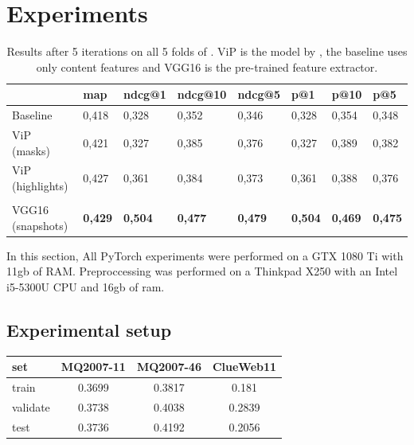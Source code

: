 \section{Experiments}\label{sec:experiments}

\begin{table}[t]
\begin{tabular}{l | lllllll }
\toprule
         & map   & ndcg@1 & ndcg@10 & ndcg@5 & p@1   & p@10  & p@5   \\ \midrule
Baseline  & 0,418 & 0,328  & 0,352   & 0,346  & 0,328 & 0,354 & 0,348 \\
ViP (masks)       & 0,421 & 0,327  & 0,385   & 0,376  & 0,327 & 0,389 & 0,382 \\
ViP (highlights)  & 0,427 & 0,361  & 0,384   & 0,373  & 0,361 & 0,388 & 0,376 \\
                 &       &        &         &        &       &       &       \\\bottomrule
VGG16 (snapshots) & \textbf{0,429} & \textbf{0,504}  & \textbf{0,477}   & \textbf{0,479}  & \textbf{0,504} & \textbf{0,469} & \textbf{0,475} \\ \bottomrule
\end{tabular}
\centering
\caption{Results after 5 iterations on all 5 folds of \datasetname. ViP is the model by \citet{fan2017learning}, the baseline uses only content features and VGG16 is the pre-trained feature extractor.}
\label{tab:results}
\end{table}


In this section, 
All PyTorch experiments were performed on a GTX 1080 Ti with 11gb of RAM. Preproccessing was performed on a Thinkpad X250 with an Intel i5-5300U CPU and 16gb of ram. 

\subsection{Experimental setup}
\begin{center}
  \begin{tabular}{ l | c | c | c}
    set & MQ2007-11 & MQ2007-46 & ClueWeb11  \\
    \hline
    train & 0.3699 & 0.3817 & 0.181 \\
    validate & 0.3738 & 0.4038 & 0.2839\\
    test & 0.3736 & 0.4192 & 0.2056\\
    \hline
  \end{tabular}
   \label{tab:countsscoure} 
\end{center}

